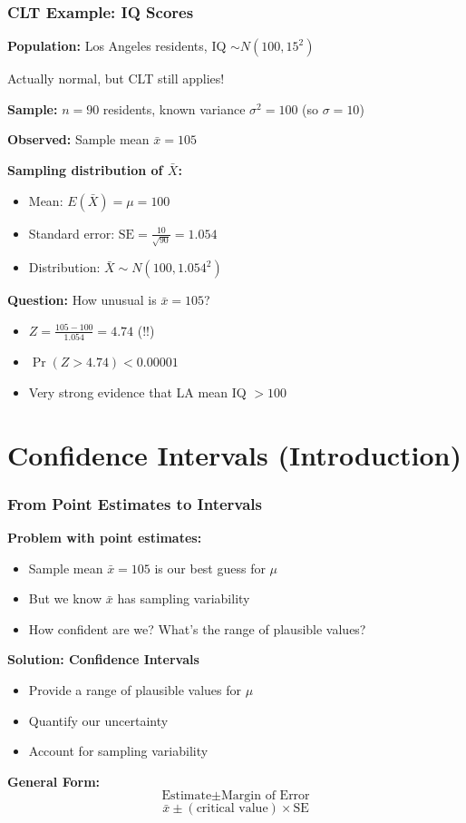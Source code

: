 \documentclass{beamer}
\begin{document}
\begin{frame}
\frametitle{CLT Example: IQ Scores}
\textbf{Population:} Los Angeles residents, IQ $\sim N(100, 15^2)$

Actually normal, but CLT still applies!

\vspace{0.3cm}
\textbf{Sample:} $n = 90$ residents, known variance $\sigma^2 = 100$ (so $\sigma = 10$)

\vspace{0.3cm}
\textbf{Observed:} Sample mean $\bar{x} = 105$

\vspace{0.5cm}
\textbf{Sampling distribution of $\bar{X}$:}
\begin{itemize}
\item Mean: $E(\bar{X}) = \mu = 100$
\item Standard error: $\text{SE} = \frac{10}{\sqrt{90}} = 1.054$
\item Distribution: $\bar{X} \sim N(100, 1.054^2)$
\end{itemize}

\vspace{0.3cm}
\textbf{Question:} How unusual is $\bar{x} = 105$?
\begin{itemize}
\item $Z = \frac{105 - 100}{1.054} = 4.74$ (!!)
\item $\Pr(Z > 4.74) < 0.00001$
\item Very strong evidence that LA mean IQ $> 100$
\end{itemize}
\end{frame}

\section{Confidence Intervals (Introduction)}

\begin{frame}
\frametitle{From Point Estimates to Intervals}
\textbf{Problem with point estimates:}
\begin{itemize}
\item Sample mean $\bar{x} = 105$ is our best guess for $\mu$
\item But we know $\bar{x}$ has sampling variability
\item How confident are we? What's the range of plausible values?
\end{itemize}

\vspace{0.5cm}
\textbf{Solution: Confidence Intervals}
\begin{itemize}
\item Provide a range of plausible values for $\mu$
\item Quantify our uncertainty
\item Account for sampling variability
\end{itemize}

\vspace{0.5cm}
\textbf{General Form:}
$$\text{Estimate} \pm \text{Margin of Error}$$
$$\bar{x} \pm (\text{critical value}) \times \text{SE}$$
\end{frame}
\end{document}
